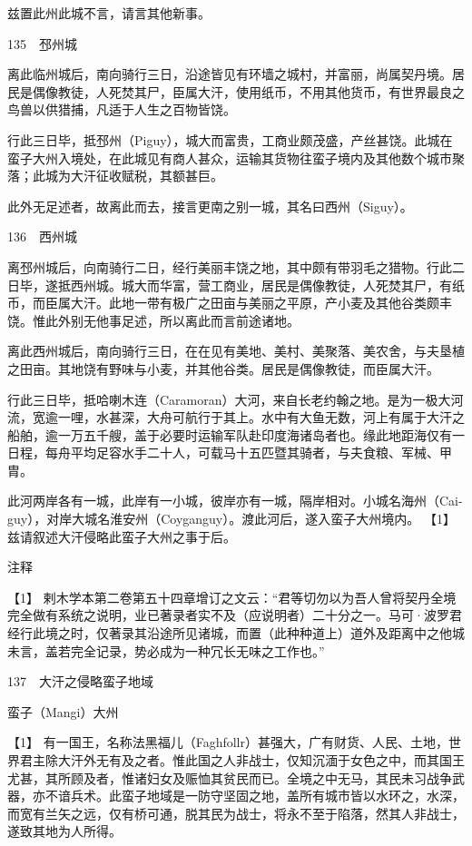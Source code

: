 \documentclass[12pt,UTF8]{ctexbook}
\begin{document}
兹置此州此城不言，请言其他新事。





135　邳州城

离此临州城后，南向骑行三日，沿途皆见有环墙之城村，并富丽，尚属契丹境。居民是偶像教徒，人死焚其尸，臣属大汗，使用纸币，不用其他货币，有世界最良之鸟兽以供猎捕，凡适于人生之百物皆饶。

行此三日毕，抵邳州（Piguy），城大而富贵，工商业颇茂盛，产丝甚饶。此城在蛮子大州入境处，在此城见有商人甚众，运输其货物往蛮子境内及其他数个城市聚落；此城为大汗征收赋税，其额甚巨。

此外无足述者，故离此而去，接言更南之别一城，其名曰西州（Siguy）。





136　西州城

离邳州城后，向南骑行二日，经行美丽丰饶之地，其中颇有带羽毛之猎物。行此二日毕，遂抵西州城。城大而华富，营工商业，居民是偶像教徒，人死焚其尸，有纸币，而臣属大汗。此地一带有极广之田亩与美丽之平原，产小麦及其他谷类颇丰饶。惟此外别无他事足述，所以离此而言前途诸地。

离此西州城后，南向骑行三日，在在见有美地、美村、美聚落、美农舍，与夫垦植之田亩。其地饶有野味与小麦，并其他谷类。居民是偶像教徒，而臣属大汗。

行此三日毕，抵哈喇木连（Caramoran）大河，来自长老约翰之地。是为一极大河流，宽逾一哩，水甚深，大舟可航行于其上。水中有大鱼无数，河上有属于大汗之船舶，逾一万五千艘，盖于必要时运输军队赴印度海诸岛者也。缘此地距海仅有一日程，每舟平均足容水手二十人，可载马十五匹暨其骑者，与夫食粮、军械、甲胄。

此河两岸各有一城，此岸有一小城，彼岸亦有一城，隔岸相对。小城名海州（Cai-guy），对岸大城名淮安州（Coyganguy）。渡此河后，遂入蛮子大州境内。 【1】 兹请叙述大汗侵略此蛮子大州之事于后。

注释

【1】 剌木学本第二卷第五十四章增订之文云：“君等切勿以为吾人曾将契丹全境完全做有系统之说明，业已著录者实不及（应说明者）二十分之一。马可·波罗君经行此境之时，仅著录其沿途所见诸城，而置（此种种道上）道外及距离中之他城未言，盖若完全记录，势必成为一种冗长无味之工作也。”





137　大汗之侵略蛮子地域

蛮子（Mangi）大州





【1】 有一国王，名称法黑福儿（Faghfollr）甚强大，广有财货、人民、土地，世界君主除大汗外无有及之者。惟此国之人非战士，仅知沉湎于女色之中，而其国王尤甚，其所顾及者，惟诸妇女及赈恤其贫民而已。全境之中无马，其民未习战争武器，亦不谙兵术。此蛮子地域是一防守坚固之地，盖所有城市皆以水环之，水深，而宽有兰矢之远，仅有桥可通，脱其民为战士，将永不至于陷落，然其人非战士，遂致其地为人所得。
\end{document}
